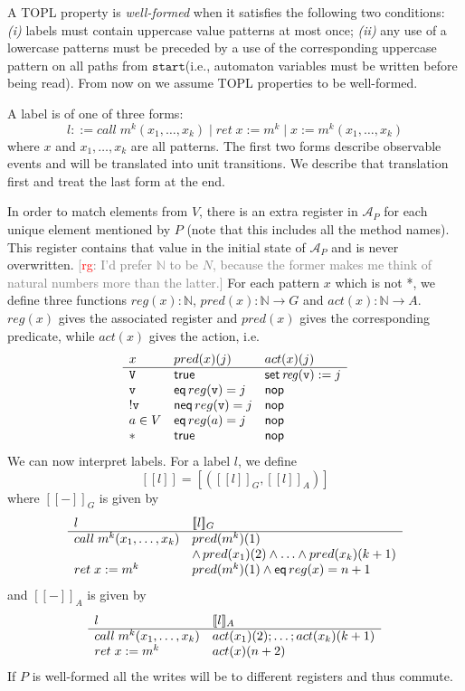 \documentclass[9pt, preprint]{sigplanconf} %
\newcommand{\noterg}[2]{\textcolor{gray}{[\textcolor{red}{#1}: #2]}}
\newcommand{\rg}[1]{\noterg{rg}{#1}}
\newcommand{\N}{\ensuremath{\mathbb{N}}}
\newcommand{\A}{\ensuremath{\mathcal{A}}}
\newcommand{\start}{\ensuremath{\mathtt{start}}\xspace}
\theoremstyle{definition}
\theoremstyle{remark}
\begin{document}
\smallskip
A TOPL property is \emph{well-formed} when it satisfies the following two conditions:
{\em (i)} labels must contain uppercase value patterns at most once; {\em (ii)}
any use of a lowercase patterns must be preceded by a use of the corresponding uppercase pattern on all paths from \start  (i.e., automaton variables must be written before being read).
From now on we assume TOPL properties to be well-formed.

A label is of one of three forms:
\[
  l ::=
  call\;m^k(x_1, \ldots, x_k) \mid
  ret\;x := m^k \mid
  x := m^k(x_1, \ldots, x_k)
\]
where $x$ and $x_1, \ldots, x_k$ are all patterns.
The first two forms describe observable events and will be translated
into unit transitions. We describe that translation first and treat
the last form at the end.

In order to match elements from $V$, there is an extra register in
$\A_P$ for each unique element mentioned by $P$ (note that this
includes all the method names). This register contains
that value in the initial state of $\A_P$ and is never overwritten.
\rg{I'd prefer $\N$ to be $N$, because the former makes me think of natural numbers more than the latter.}
For each pattern $x$ which is not *, we define three functions $reg(x) : \N$,
$pred(x) : \N\to G$ and $act(x) : \N\to A$. $reg(x)$ gives the associated register and $pred(x)$ gives
the corresponding predicate, while $act(x)$ gives the action, i.e.
\[
\begin{array}{l l l}
  x & pred(x)(j) & act(x)(j) \\
  \hline
  \mathtt{V} & {\sf true} & {\sf set}\,{\it reg}({\tt v}):=j \\
  \mathtt{v} & {\sf eq}\,reg(\mathtt{v})=j & {\sf nop} \\
  \mathtt{!v} & {\sf neq}\,reg(\mathtt{v})=j  & {\sf nop}  \\
  a\in V & {\sf eq}\,reg(a)=j  & {\sf nop}  \\
  * & {\sf true} & {\sf nop}  \\
\end{array}
\]
We can now interpret labels.
\newcommand{\den}[1]{[\![#1]\!]}
\newcommand{\denG}[1]{\den{#1}_G}
\newcommand{\denA}[1]{\den{#1}_A}
For a label $l$, we define
\[
\den{l} = [(\denG{l}, \denA{l})]
\]
where $\denG-$ is given by
\[
\begin{array}{l l}
  l & \denG l \\
  \hline
  call\;m^k(x_1, \ldots, x_k) & pred(m^k)(1) \\
                                           & \land\,pred(x_1)(2) \land\ldots\land pred(x_k)(k+1) \\
  ret\;x := m^k & pred(m^k)(1) \land {\sf eq}\,reg(x) = n+1 \\
\end{array}
\]
and $\denA-$ is given by
\[
\begin{array}{l l l}
  l & \denA l \\
  \hline
  call\;m^k(x_1, \ldots, x_k) & act(x_1)(2); \dots; act(x_k)(k+1) \\
  ret\;x := m^k & act(x)(n+2) \\
\end{array}
\]
If $P$ is well-formed all the writes will be to different registers
and thus commute.
\end{document}
